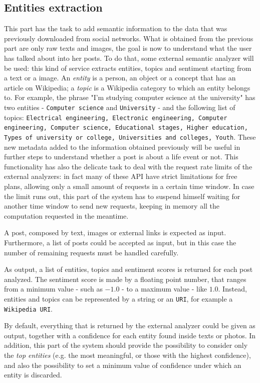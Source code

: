 \subsection{Entities extraction}
This part has the task to add semantic information to the data that was previously downloaded from social networks. What is obtained from the previous part are only raw texts and images, the goal is now to understand what the user has talked about into her posts. To do that, some external semantic analyzer will be used: this kind of service extracts entities, topics and sentiment starting from a text or a image. An \emph{entity} is a person, an object or a concept that has an article on Wikipedia; a \emph{topic} is a Wikipedia category to which an entity belongs to. For example, the phrase "I'm studying computer science at the university" has two entities - \texttt{Computer science} and \texttt{University} - and the following list of topics: \texttt{Electrical engineering, Electronic engineering, Computer engineering, Computer science, Educational stages, Higher education, Types of university or col\-le\-ge, Universities and colleges, Youth}. These new metadata added to the information obtained previously will be useful in further steps to understand whether a post is about a life event or not. This functionality has also the delicate task to deal with the request rate limits of the external analyzers: in fact many of these API have strict limitations for free plans, allowing only a small amount of requests in a certain time window. In case the limit runs out, this part of the system has to suspend himself waiting for another time window to send new requests, keeping in memory all the computation requested in the meantime.

A post, composed by text, images or external links is expected as input. Furthermore, a list of posts could be accepted as input, but in this case the number of remaining requests must be handled carefully.

As output, a list of entities, topics and sentiment scores is returned for each post analyzed. The sentiment score is made by a floating point number, that ranges from a minimum value - such as $ -1.0 $ - to a maximum value - like $ 1.0 $. Instead, entities and topics can be represented by a string or an \texttt{URI}, for example a \texttt{Wikipedia URI}.

By default, everything that is returned by the external analyzer could be given as output, together with a confidence for each entity found inside texts or photos. In addition, this part of the system should provide the possibility to consider only the \emph{top entities} (e.g. the most meaningful, or those with the highest confidence), and also the possibility to set a minimum value of confidence under which an entity is discarded.

